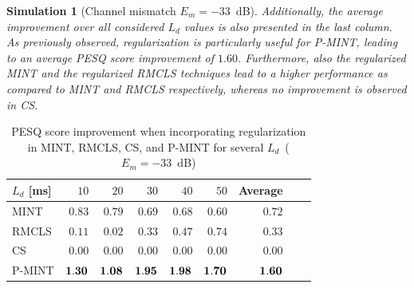 \documentclass[10pt]{IEEEtran}
\newtheorem{simulation}{Simulation}
\begin{document}
\begin{simulation}[Channel mismatch $E_m=-33$~dB]
Additionally, the average improvement over all considered $L_d$ values is also presented in the last column.
As previously observed, regularization is particularly useful for P-MINT, leading to an average PESQ score improvement of $1.60$.
Furthermore, also the regularized MINT and the regularized RMCLS techniques lead to a higher performance as compared to MINT and RMCLS respectively, whereas no improvement is observed in CS.
\end{simulation}
\begin{table}[b]
\centering
\caption{PESQ score improvement when incorporating regularization in MINT, RMCLS, CS, and P-MINT for several $L_d$~($E_m = -33$~dB)}
\label{tbl: pesq1}
\begin{tabular}{|l|r|r|r|r|r|r|r|r|}
\hline
$L_d$ [ms] & $10$ & $20$ & $30$ & $40$ & $50$ & Average  \\
\hline
MINT & $0.83$ & $0.79$ & $0.69$ & $0.68$ & $0.60$ & $0.72$ \\
\hline
RMCLS & $0.11$ & $0.02$ & $0.33$ & $0.47$ & $0.74$ & $0.33$ \\
\hline
CS & $0.00$ & $0.00$ & $0.00$ & $0.00$ & $0.00$ & $0.00$ \\
\hline
P-MINT & $\bf{1.30}$ & $\bf{1.08}$ & $\bf{1.95}$ & $\bf{1.98}$ & $\bf{1.70}$ & $\bf{1.60}$ \\
\hline
\end{tabular}

\end{table}
\end{document}
